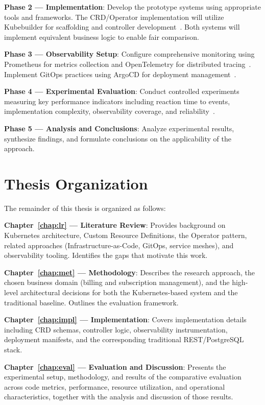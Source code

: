 \textbf{Phase 2 — Implementation}: Develop the prototype systems using appropriate tools and frameworks. The CRD/Operator implementation will utilize Kubebuilder for scaffolding and controller development~\cite{kubebuilder}. Both systems will implement equivalent business logic to enable fair comparison.

\textbf{Phase 3 — Observability Setup}: Configure comprehensive monitoring using Prometheus for metrics collection and OpenTelemetry for distributed tracing~\cite{prometheus, opentelemetry, prometheus_cloud_native_monitoring}. Implement GitOps practices using ArgoCD for deployment management~\cite{argocd, gitops}.

\textbf{Phase 4 — Experimental Evaluation}: Conduct controlled experiments measuring key performance indicators including reaction time to events, implementation complexity, observability coverage, and reliability~\cite{hpc_monitoring_kubernetes_prometheus}.

\textbf{Phase 5 — Analysis and Conclusions}: Analyze experimental results, synthesize findings, and formulate conclusions on the applicability of the approach.

\section{Thesis Organization}

The remainder of this thesis is organized as follows:

\textbf{Chapter~\ref{chap:lr} --- Literature Review}: Provides background on Kubernetes architecture, Custom Resource Definitions, the Operator pattern, related approaches (Infrastructure-as-Code, GitOps, service meshes), and observability tooling. Identifies the gaps that motivate this work.

\textbf{Chapter~\ref{chap:met} --- Methodology}: Describes the research approach, the chosen business domain (billing and subscription management), and the high-level architectural decisions for both the Kubernetes-based system and the traditional baseline. Outlines the evaluation framework.

\textbf{Chapter~\ref{chap:impl} --- Implementation}: Covers implementation details including CRD schemas, controller logic, observability instrumentation, deployment manifests, and the corresponding traditional REST/PostgreSQL stack.

\textbf{Chapter~\ref{chap:eval} --- Evaluation and Discussion}: Presents the experimental setup, methodology, and results of the comparative evaluation across code metrics, performance, resource utilization, and operational characteristics, together with the analysis and discussion of those results.

